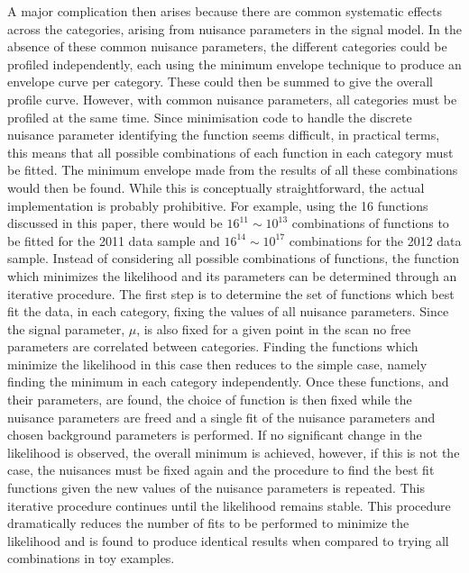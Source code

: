 A major complication then arises because there are common systematic effects
across the categories, arising from nuisance parameters in the signal
model.
In the absence of these common nuisance parameters,
the different categories could be profiled independently, each using the
minimum envelope technique to produce an envelope curve per category.
These could then
be summed to give the overall profile curve. However, with common
nuisance parameters, all categories must be profiled at the same time.
Since minimisation code to handle the 
discrete nuisance parameter identifying the
function seems difficult, in practical terms, this means that all possible
combinations of each function in each category must be fitted.
The minimum envelope made from the results of all these combinations would
then be found. While this is conceptually straightforward, the actual
implementation is probably prohibitive. For example, using the 16 functions
discussed in this paper, there would be $16^{11} \sim 10^{13}$ combinations 
of functions to be fitted for the 2011 data sample and $16^{14} \sim 10^{17}$ 
combinations for the 2012 data sample.
Instead of considering all possible combinations of functions, the function 
which minimizes the likelihood and its parameters can be determined through 
an iterative procedure. The first step is to determine the set of functions 
which best fit the data, in each category, fixing the values of all nuisance 
parameters.
Since the signal parameter, $\mu$, is also fixed for a given point in the scan 
no free parameters are correlated between categories.
Finding the functions which minimize the likelihood in 
this case then reduces to the simple case, namely finding the minimum in each 
category independently. 
Once these functions, and their parameters, are found, the choice of function 
is then fixed while the nuisance parameters are freed and a single fit of the 
nuisance parameters and chosen background parameters is performed.
If no significant change in the likelihood is observed, the overall minimum is 
achieved, however, if this is not the case, the nuisances must be fixed again 
and the procedure to find the best fit functions given the new values of the 
nuisance parameters is repeated.
This iterative procedure continues until the likelihood remains stable.
This procedure dramatically reduces the number of fits to be performed 
to minimize the likelihood and is found to produce identical results when 
compared to trying all combinations in toy examples. 






